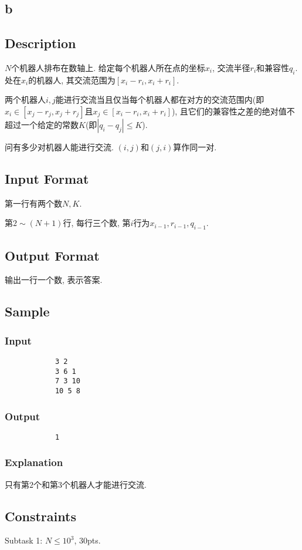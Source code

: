 \documentclass[UTF8, 11pt]{ctexart}
\begin{document}
\begin{CJK}{UTF8}{gkai}
\begin{spacing}{1.2}
	\newpage
	\section{b}
		\subsection{Description}
			$N$个机器人排布在数轴上. 给定每个机器人所在点的坐标$x_i$, 交流半径$r_i$和兼容性$q_i$. 处在$x_i$的机器人, 其交流范围为$[x_i-r_i, x_i+r_i]$.

			两个机器人$i,j$能进行交流当且仅当每个机器人都在对方的交流范围内(即$x_i\in[x_j-r_j,x_j+r_j]$且$x_j\in[x_i-r_i,x_i+r_i]$), 且它们的兼容性之差的绝对值不超过一个给定的常数$K$(即$|q_i-q_j|\le K$).

			问有多少对机器人能进行交流. $(i,j)$和$(j,i)$算作同一对.
		\subsection{Input Format}
			第一行有两个数$N,K$.

			第$2\sim (N+1)$行, 每行三个数, 第$i$行为$x_{i-1},r_{i-1},q_{i-1}$.
		\subsection{Output Format}
			输出一行一个数, 表示答案.
		\subsection{Sample}
		\subsubsection{Input}
		\begin{verbatim}
		    3 2
		    3 6 1
		    7 3 10
		    10 5 8
		\end{verbatim}
		\subsubsection{Output}
		\begin{verbatim}
		    1
		\end{verbatim}
		\subsubsection{Explanation}
			只有第$2$个和第$3$个机器人才能进行交流.
		\subsection{Constraints}
			Subtask 1: $N\le10^3$, 30pts.


\end{spacing}
\end{CJK}
\end{document}
